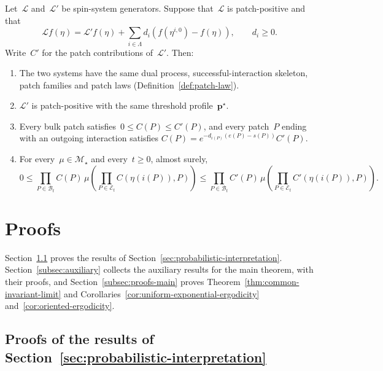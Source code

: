 \documentclass[EJP,preprint,NODS,nobera]{ejpecp}
\newcommand{\bb}[1]{\left(#1\right)}
\newcommand{\mb}[1]{\mathbf{#1}}
\newcommand{\Lcal}{\mathcal{L}}
\newcommand{\chg}[1]{{\color{changegreen}#1}}
\begin{document}
\begin{proposition}
\label{prop:death-removal}
Let~$\Lcal$ and~$\Lcal'$ be spin-system generators. Suppose that~$\Lcal$ is
patch-positive and that
\begin{equation}
\label{eq:pure-death-decomposition-revision}
\Lcal f(\eta)
=
\Lcal'f(\eta)
+
\sum_{i\in\Lambda}d_i
\bb{f\bb{\eta^{i,0}}-f(\eta)},
\qquad d_i\geq0.
\end{equation}
Write~$C'$ for the patch contributions of~$\Lcal'$. Then:
\begin{enumerate}[label=\textup{(\roman*)}]
\item The two systems have the same dual process, successful-interaction
skeleton, patch families and patch laws
\chg{(Definition~\ref{def:patch-law})}.
\item $\Lcal'$ is patch-positive with the same threshold profile~$\mb p^\star$.
\item Every bulk patch satisfies~$0\leq C(P)\leq C'(P)$, and every patch~$P$
ending with an outgoing interaction satisfies
$C(P)=e^{-d_{i(P)}(e(P)-s(P))}C'(P)$.
\item For every~$\mu\in\mathcal M_\star$ and every~$t\geq0$, almost surely,
\begin{equation}
\label{eq:death-removal-weight-comparison}
0
\leq
\prod_{P\in\mathcal B_t}C(P)\,
\mu\bb{
\prod_{P\in\mathcal E_t}
C\bb{\eta\bb{i(P)},P}
}
\leq
\prod_{P\in\mathcal B_t}C'(P)\,
\mu\bb{
\prod_{P\in\mathcal E_t}
C'\bb{\eta\bb{i(P)},P}
}.
\end{equation}
\end{enumerate}
\end{proposition}

\section{Proofs}
\label{sec:proofs}

\chg{Section~\ref{subsec:proofs-section-4} proves the results of
Section~\ref{sec:probabilistic-interpretation}.
Section~\ref{subsec:auxiliary} collects the auxiliary results for the main
theorem, with their proofs, and} Section~\ref{subsec:proofs-main} proves
Theorem~\ref{thm:common-invariant-limit} and
Corollaries~\ref{cor:uniform-exponential-ergodicity}
and~\ref{cor:oriented-ergodicity}.

\subsection{\texorpdfstring{Proofs of the results of Section~\ref{sec:probabilistic-interpretation}}{Proofs of the results of Section 4}}
\label{subsec:proofs-section-4}
\end{document}
